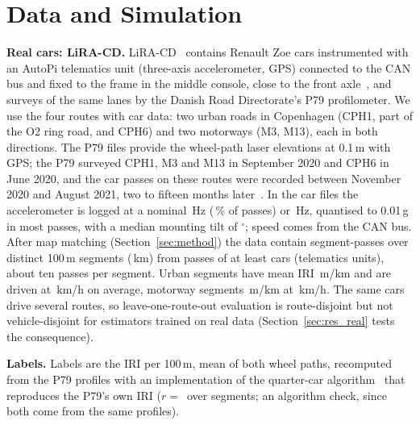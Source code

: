 \section{Data and Simulation}
\label{sec:data}

\textbf{Real cars: LiRA-CD.}
LiRA-CD~\cite{skar2023lira,lira_data} contains Renault Zoe cars instrumented with an AutoPi telematics unit (three-axis accelerometer, GPS) connected to the CAN bus and fixed to the frame in the middle console, close to the front axle~\cite{skar2023lira}, and surveys of the same lanes by the Danish Road Directorate's P79 profilometer.
We use the four routes with car data: two urban roads in Copenhagen (CPH1, part of the O2 ring road, and CPH6) and two motorways (M3, M13), each in both directions.
The P79 files provide the wheel-path laser elevations at 0.1\,m with GPS; the P79 surveyed CPH1, M3 and M13 in September 2020 and CPH6 in June 2020, and the car passes on these routes were recorded between November 2020 and August 2021, two to fifteen months later~\cite{lira_data}.
In the car files the accelerometer is logged at a nominal \liraRateLow\,Hz (\liraRateLowShare\,\% of passes) or \liraRateHigh\,Hz, quantised to 0.01\,g in most passes, with a median mounting tilt of \liraTiltMedian$^\circ$; speed comes from the CAN bus.
After map matching (Section~\ref{sec:method}) the data contain \liraUnits{} segment-passes over \liraSegments{} distinct 100\,m segments (\liraKm\,km) from \liraPasses{} passes of at least \liraDevices{} cars (telematics units), about ten passes per segment.
Urban segments have mean IRI \liraIriUrban\,m/km and are driven at \liraSpeedUrban\,km/h on average, motorway segments \liraIriMotorway\,m/km at \liraSpeedMotorway\,km/h.
The same cars drive several routes, so leave-one-route-out evaluation is route-disjoint but not vehicle-disjoint for estimators trained on real data (Section~\ref{sec:res_real} tests the consequence).

\textbf{Labels.}
Labels are the IRI per 100\,m, mean of both wheel paths, recomputed from the P79 profiles with an implementation of the quarter-car algorithm~\cite{sayers1995iri,astm_e1926} that reproduces the P79's own IRI ($r=$\,\iriValR{} over \iriValN{} segments; an algorithm check, since both come from the same profiles).

